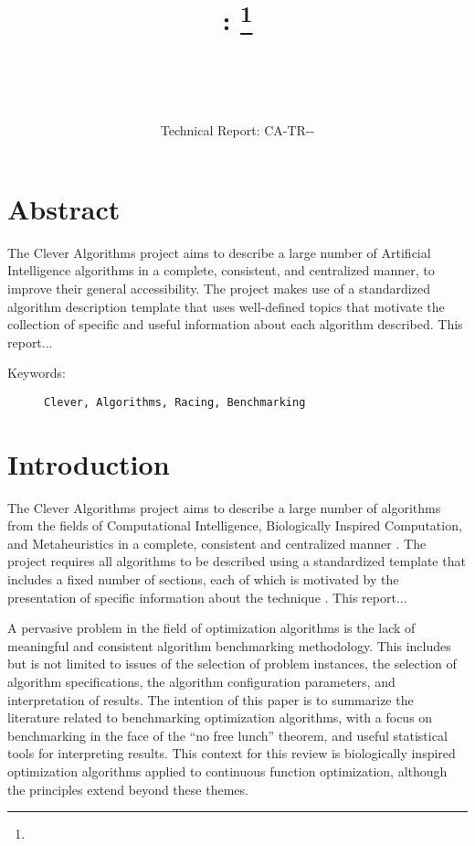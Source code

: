 \documentclass[a4paper, 11pt]{article}
\title{{\myreporttitle}: {\myreportsubtitle}\footnote{\myreportlicense}}
\author{\myreportauthor\\{\myreportemail}\\\small\myreportproject}
\date{\myreportfulldate\\{\small{Technical Report: CA-TR-{\myreportdate}-\myreportversion}}}
\begin{document}
\maketitle

\section*{Abstract} 
The Clever Algorithms project aims to describe a large number of Artificial Intelligence algorithms in a complete, consistent, and centralized manner, to improve their general accessibility. 
The project makes use of a standardized algorithm description template that uses well-defined topics that motivate the collection of specific and useful information about each algorithm described.
This report...

\begin{description}
	\item[Keywords:] {\small\texttt{Clever, Algorithms, Racing, Benchmarking}}
\end{description} 

\section{Introduction}
\label{sec:introduction}
The Clever Algorithms project aims to describe a large number of algorithms from the fields of Computational Intelligence, Biologically Inspired Computation, and Metaheuristics in a complete, consistent and centralized manner \cite{Brownlee2010}.
The project requires all algorithms to be described using a standardized template that includes a fixed number of sections, each of which is motivated by the presentation of specific information about the technique \cite{Brownlee2010a}.
This report...

A pervasive problem in the field of optimization algorithms is the lack of meaningful and consistent algorithm benchmarking methodology. This includes but is not limited to issues of the selection of problem instances, the selection of algorithm specifications, the algorithm configuration parameters, and interpretation of results. The intention of this paper is to summarize the literature related to benchmarking optimization algorithms, with a focus on benchmarking in the face of the “no free lunch” theorem, and useful statistical tools for interpreting results. This context for this review is biologically inspired optimization algorithms applied to continuous function optimization, although the principles extend beyond these themes.
\end{document}
